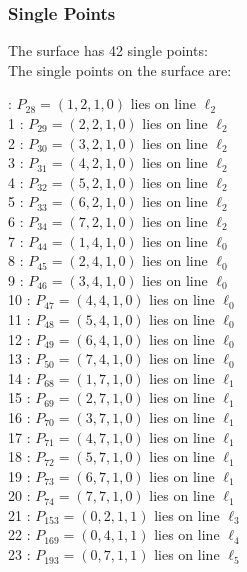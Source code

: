 \documentclass{article}
\begin{document}
{\subsubsection*{Single Points}
The surface has 42 single points:\\
The single points on the surface are:\\
\begin{multicols}{2}
 : $P_{28}=( 1, 2, 1, 0 )$ lies on line $\ell_{2}$\\
1 : $P_{29}=( 2, 2, 1, 0 )$ lies on line $\ell_{2}$\\
2 : $P_{30}=( 3, 2, 1, 0 )$ lies on line $\ell_{2}$\\
3 : $P_{31}=( 4, 2, 1, 0 )$ lies on line $\ell_{2}$\\
4 : $P_{32}=( 5, 2, 1, 0 )$ lies on line $\ell_{2}$\\
5 : $P_{33}=( 6, 2, 1, 0 )$ lies on line $\ell_{2}$\\
6 : $P_{34}=( 7, 2, 1, 0 )$ lies on line $\ell_{2}$\\
7 : $P_{44}=( 1, 4, 1, 0 )$ lies on line $\ell_{0}$\\
8 : $P_{45}=( 2, 4, 1, 0 )$ lies on line $\ell_{0}$\\
9 : $P_{46}=( 3, 4, 1, 0 )$ lies on line $\ell_{0}$\\
10 : $P_{47}=( 4, 4, 1, 0 )$ lies on line $\ell_{0}$\\
11 : $P_{48}=( 5, 4, 1, 0 )$ lies on line $\ell_{0}$\\
12 : $P_{49}=( 6, 4, 1, 0 )$ lies on line $\ell_{0}$\\
13 : $P_{50}=( 7, 4, 1, 0 )$ lies on line $\ell_{0}$\\
14 : $P_{68}=( 1, 7, 1, 0 )$ lies on line $\ell_{1}$\\
15 : $P_{69}=( 2, 7, 1, 0 )$ lies on line $\ell_{1}$\\
16 : $P_{70}=( 3, 7, 1, 0 )$ lies on line $\ell_{1}$\\
17 : $P_{71}=( 4, 7, 1, 0 )$ lies on line $\ell_{1}$\\
18 : $P_{72}=( 5, 7, 1, 0 )$ lies on line $\ell_{1}$\\
19 : $P_{73}=( 6, 7, 1, 0 )$ lies on line $\ell_{1}$\\
20 : $P_{74}=( 7, 7, 1, 0 )$ lies on line $\ell_{1}$\\
21 : $P_{153}=( 0, 2, 1, 1 )$ lies on line $\ell_{3}$\\
22 : $P_{169}=( 0, 4, 1, 1 )$ lies on line $\ell_{4}$\\
23 : $P_{193}=( 0, 7, 1, 1 )$ lies on line $\ell_{5}$\\

\end{multicols}}
\end{document}
